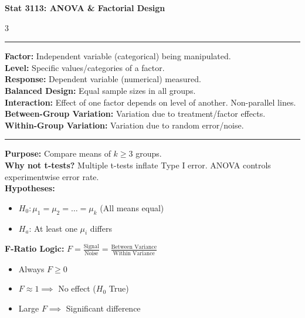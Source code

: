 \documentclass[7pt, letterpaper]{article}
\newcommand{\sectionhead}[1]{%
    \vspace{0.5mm}{\normalsize\bfseries#1}\vspace{0mm}\hrule\vspace{0.5mm}%
}
\begin{document}
\begin{center}
    {\Large\bfseries Stat 3113: ANOVA \& Factorial Design}
\end{center}
\vspace{-2mm}

\begin{multicols}{3}
\small

\sectionhead{Key Definitions}
\textbf{Factor:} Independent variable (categorical) being manipulated. \\
\textbf{Level:} Specific values/categories of a factor. \\
\textbf{Response:} Dependent variable (numerical) measured. \\
\textbf{Balanced Design:} Equal sample sizes in all groups. \\
\textbf{Interaction:} Effect of one factor depends on level of another. Non-parallel lines. \\
\textbf{Between-Group Variation:} Variation due to treatment/factor effects. \\
\textbf{Within-Group Variation:} Variation due to random error/noise.

\sectionhead{ANOVA Fundamentals}
\textbf{Purpose:} Compare means of $k \ge 3$ groups. \\
\textbf{Why not t-tests?} Multiple t-tests inflate Type I error. ANOVA controls experimentwise error rate. \\
\textbf{Hypotheses:}
\begin{itemize}
    \item $H_0: \mu_1 = \mu_2 = \dots = \mu_k$ (All means equal)
    \item $H_a$: At least one $\mu_i$ differs
\end{itemize}
\textbf{F-Ratio Logic:} $F = \frac{\text{Signal}}{\text{Noise}} = \frac{\text{Between Variance}}{\text{Within Variance}}$
\begin{itemize}
    \item Always $F \ge 0$
    \item $F \approx 1 \implies$ No effect ($H_0$ True)
    \item Large $F \implies$ Significant difference
\end{itemize}


\end{multicols}
\end{document}
